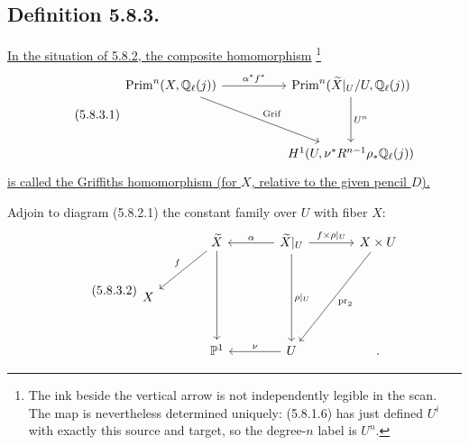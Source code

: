 \subsection*{Definition 5.8.3.}
\underline{In the situation of 5.8.2, the composite homomorphism}
\footnote{The ink beside the vertical arrow is not independently legible in
the scan.  The map is nevertheless determined uniquely: (5.8.1.6) has just
defined $U^i$ with exactly this source and target, so the degree-$n$ label is
$U^n$.}
\begin{equation}\tag{5.8.3.1}
\begin{tikzcd}[column sep=huge,row sep=huge]
\operatorname{Prim}^n(X,\mathbb Q_\ell(j))
  \arrow[r,"\alpha^*f^*"]
  \arrow[dr,"\operatorname{Grif}"]
&
\operatorname{Prim}^n(\widetilde X|_U/U,\mathbb Q_\ell(j))
  \arrow[d,"U^n"]
\\
{}
&
H^1(U,\nu^*R^{n-1}\rho_*\mathbb Q_\ell(j))
\end{tikzcd}
\end{equation}
\underline{is called the Griffiths homomorphism (for $X$, relative to the
given pencil $D$).}

Adjoin to diagram (5.8.2.1) the constant family over $U$ with fiber $X$:
\begin{equation}\tag{5.8.3.2}
\begin{tikzcd}[row sep=large,column sep=large]
{}
&
\widetilde X
  \arrow[dl,"f"']
  \arrow[dd]
&
\widetilde X|_U
  \arrow[l,"\alpha"']
  \arrow[r,"f\times\rho|_U"]
  \arrow[dd,"\rho|_U"]
&
X\times U
  \arrow[ddl,"\operatorname{pr}_2"]
\\
X&{}&{}&{}
\\
{}
&
\mathbb P^1
&
U\arrow[l,"\nu"']
&
.
\end{tikzcd}
\end{equation}


